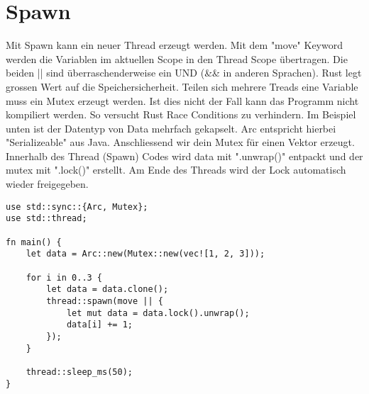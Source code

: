 \section{Spawn}

Mit Spawn kann ein neuer Thread erzeugt werden. Mit dem "move" Keyword werden die Variablen im aktuellen Scope in den Thread Scope übertragen. Die beiden || sind überraschenderweise ein UND (\&\& in anderen Sprachen). Rust legt grossen Wert auf die Speichersicherheit. Teilen sich mehrere Treads eine Variable muss ein Mutex erzeugt werden. Ist dies nicht der Fall kann das Programm nicht kompiliert werden. So versucht Rust Race Conditions zu verhindern.
Im Beispiel unten ist der Datentyp von Data mehrfach gekapselt. Arc entspricht hierbei "Serializeable" aus Java. Anschliessend wir dein Mutex für einen Vektor erzeugt.
Innerhalb des Thread (Spawn) Codes wird data mit ".unwrap()" entpackt und der mutex mit ".lock()" erstellt. Am Ende des Threads wird der Lock automatisch wieder freigegeben.


\begin{lstlisting}
use std::sync::{Arc, Mutex};
use std::thread;

fn main() {
	let data = Arc::new(Mutex::new(vec![1, 2, 3]));

	for i in 0..3 {
		let data = data.clone();
		thread::spawn(move || {
			let mut data = data.lock().unwrap();
			data[i] += 1;
		});
	}

	thread::sleep_ms(50);
}
\end{lstlisting}